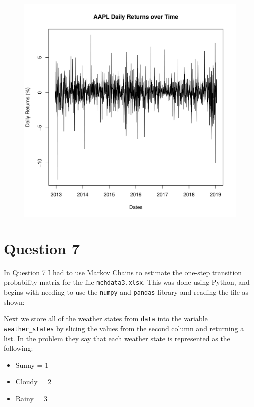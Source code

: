 \documentclass[11pt, letterpaper]{article}
\begin{document}
\begin{figure}[h!]
	\centering
	\includegraphics[scale=0.55]{code/q6-2.png}
\end{figure}

\section*{Question 7}
In Question 7 I had to use Markov Chains to estimate the one-step transition
probability matrix for the
file \verb|mchdata3.xlsx|. This was done using Python, and begins with needing
to use the \verb|numpy| and
\verb|pandas| library and reading the file as shown:

\begin{file}[q7.py (initialization)]
	
\end{file}

Next we store all of the weather states from \verb|data| into the variable
\verb|weather_states| by slicing
the values from the second column and returning a list. In the problem they say
that each weather state is represented
as the following:

\begin{itemize}
	\item Sunny = $1$
	\item Cloudy = $2$
	\item Rainy = $3$
\end{itemize}
\end{document}
